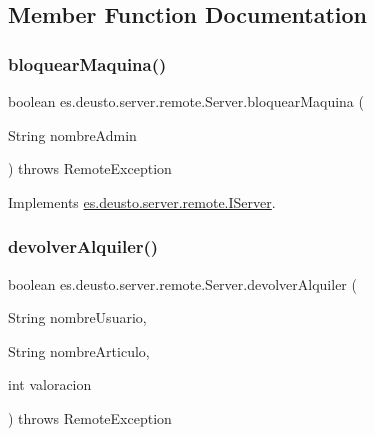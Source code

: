 \subsection{Member Function Documentation}
\mbox{\label{classes_1_1deusto_1_1server_1_1remote_1_1_server_ae03d92a9f36e32fe68553bfc8506efec}} 
\subsubsection{\texorpdfstring{bloquearMaquina()}{bloquearMaquina()}}
{\footnotesize\ttfamily boolean es.\+deusto.\+server.\+remote.\+Server.\+bloquear\+Maquina (\begin{DoxyParamCaption}\item[{String}]{nombre\+Admin }\end{DoxyParamCaption}) throws Remote\+Exception}



Implements \mbox{\hyperlink{interfacees_1_1deusto_1_1server_1_1remote_1_1_i_server_adaf581e514d28fa130d44aceaf2fcc07}{es.\+deusto.\+server.\+remote.\+I\+Server}}.

\mbox{\label{classes_1_1deusto_1_1server_1_1remote_1_1_server_a980cae19c411c05bc1d1b9ec93e0083a}} 
\subsubsection{\texorpdfstring{devolverAlquiler()}{devolverAlquiler()}}
{\footnotesize\ttfamily boolean es.\+deusto.\+server.\+remote.\+Server.\+devolver\+Alquiler (\begin{DoxyParamCaption}\item[{String}]{nombre\+Usuario,  }\item[{String}]{nombre\+Articulo,  }\item[{int}]{valoracion }\end{DoxyParamCaption}) throws Remote\+Exception}



